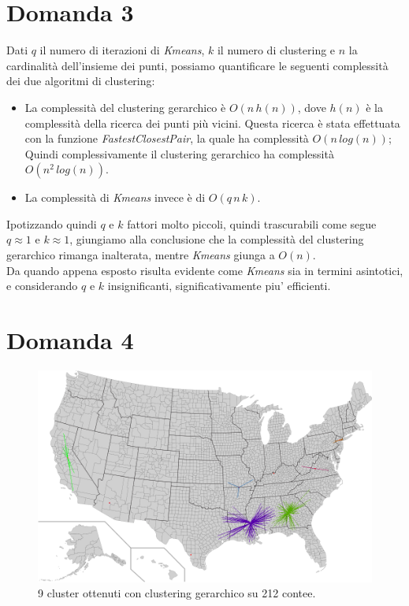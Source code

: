 \documentclass{article}
\begin{document}
\section*{Domanda 3}
Dati $q$ il numero di iterazioni di \textit{Kmeans}, $k$ il numero di clustering e $n$ la cardinalità dell'insieme dei punti, possiamo quantificare le seguenti complessità dei due algoritmi di clustering:
\begin{itemize}
	\item La complessità del clustering gerarchico è $O(n\,h(n))$, dove $h(n)$ è la complessità della ricerca dei punti più vicini.
	      Questa ricerca è stata effettuata con la funzione \textit{FastestClosestPair}, la quale ha complessità $O(n\,log(n))$;
	      Quindi complessivamente il clustering gerarchico ha complessità $O(n^2\,log(n))$.
	\item La complessità di \textit{Kmeans} invece è di $O(q\,n\,k)$. 
\end{itemize}

\noindent Ipotizzando quindi $q$ e $k$ fattori molto piccoli, quindi trascurabili come segue $q \approx 1$ e $k \approx 1$, giungiamo alla conclusione che 
la complessità del clustering gerarchico rimanga inalterata, mentre \textit{Kmeans} giunga a $O(n)$.\\
Da quando appena esposto risulta evidente come \textit{Kmeans} sia in termini asintotici, e considerando $q$ e $k$ insignificanti, significativamente piu' efficienti.

\section*{Domanda 4}
\begin{center}
	\begin{figure}[H]
		\hspace*{1.5cm}\includegraphics[width=0.8\linewidth, valign=t]{figures/Domanda4}
		\caption*{9 cluster ottenuti con clustering gerarchico su 212 contee.}
				
	\end{figure}
\end{center}
\end{document}
